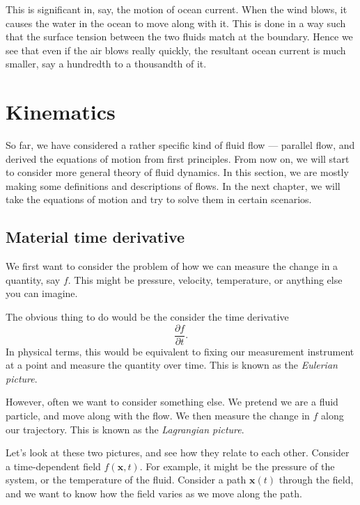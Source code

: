 \documentclass[a4paper]{article}
\begin{document}
\begin{eg}
  This is significant in, say, the motion of ocean current. When the wind blows, it causes the water in the ocean to move along with it. This is done in a way such that the surface tension between the two fluids match at the boundary. Hence we see that even if the air blows really quickly, the resultant ocean current is much smaller, say a hundredth to a thousandth of it.
\end{eg}

\section{Kinematics}
So far, we have considered a rather specific kind of fluid flow --- parallel flow, and derived the equations of motion from first principles. From now on, we will start to consider more general theory of fluid dynamics. In this section, we are mostly making some definitions and descriptions of flows. In the next chapter, we will take the equations of motion and try to solve them in certain scenarios.

\subsection{Material time derivative}
We first want to consider the problem of how we can measure the change in a quantity, say $f$. This might be pressure, velocity, temperature, or anything else you can imagine.

The obvious thing to do would be the consider the time derivative
\[
  \frac{\partial f}{\partial t}.
\]
In physical terms, this would be equivalent to fixing our measurement instrument at a point and measure the quantity over time. This is known as the \emph{Eulerian picture}.

However, often we want to consider something else. We pretend we are a fluid particle, and move along with the flow. We then measure the change in $f$ along our trajectory. This is known as the \emph{Lagrangian picture}.

Let's look at these two pictures, and see how they relate to each other. Consider a time-dependent field $f(\mathbf{x}, t)$. For example, it might be the pressure of the system, or the temperature of the fluid. Consider a path $\mathbf{x}(t)$ through the field, and we want to know how the field varies as we move along the path.
\end{document}
